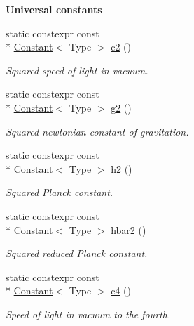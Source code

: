 \begin{Indent}{\bf Universal constants}
\begin{DoxyCompactItemize}
static constexpr const \\*
\hyperlink{exceptionmagrathea_1_1Constant}{Constant}$<$ Type $>$ \hyperlink{exceptionmagrathea_1_1Constants_ac6e9bed7cdb3d30e9063ecfdd1df8045}{c2} ()
\begin{DoxyCompactList}\small\item\em Squared speed of light in vacuum. \end{DoxyCompactList}\item 
static constexpr const \\*
\hyperlink{exceptionmagrathea_1_1Constant}{Constant}$<$ Type $>$ \hyperlink{exceptionmagrathea_1_1Constants_afa092f73261f3d6d92941da6ffc35525}{g2} ()
\begin{DoxyCompactList}\small\item\em Squared newtonian constant of gravitation. \end{DoxyCompactList}\item 
static constexpr const \\*
\hyperlink{exceptionmagrathea_1_1Constant}{Constant}$<$ Type $>$ \hyperlink{exceptionmagrathea_1_1Constants_a41ab9c250d50d238accb8e86eaf087fd}{h2} ()
\begin{DoxyCompactList}\small\item\em Squared Planck constant. \end{DoxyCompactList}\item 
static constexpr const \\*
\hyperlink{exceptionmagrathea_1_1Constant}{Constant}$<$ Type $>$ \hyperlink{exceptionmagrathea_1_1Constants_a11f7c1856f49ac031c9dbfdc9d0bb3bd}{hbar2} ()
\begin{DoxyCompactList}\small\item\em Squared reduced Planck constant. \end{DoxyCompactList}\item 
static constexpr const \\*
\hyperlink{exceptionmagrathea_1_1Constant}{Constant}$<$ Type $>$ \hyperlink{exceptionmagrathea_1_1Constants_a9d4ea077ddc29a39350ff02b2506e404}{c4} ()
\begin{DoxyCompactList}\small\item\em Speed of light in vacuum to the fourth. \end{DoxyCompactList}\end{DoxyCompactItemize}
\end{Indent}
